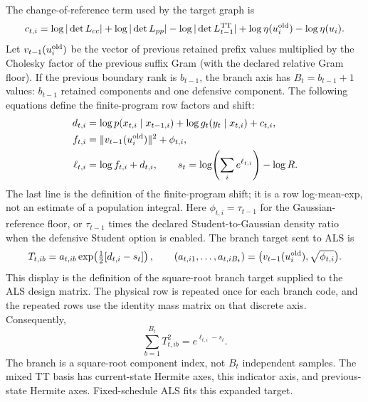 \documentclass[11pt]{article}
\begin{document}
The change-of-reference term used by the target graph is
\begin{equation}
  c_{t,i}=\log|\det L_{cc}|+\log|\det L_{pp}|
  -\log|\det L_{t-1}^{\rm TT}|
  +\log\eta(u_i^{\rm old})-\log\eta(u_i).
  \label{eq:actual-conversion}
\end{equation}
Let $v_{t-1}(u_i^{\rm old})$ be the vector of previous retained prefix
values multiplied by the Cholesky factor of the previous suffix Gram (with
the declared relative Gram floor).  If the previous boundary rank is
$b_{t-1}$, the branch axis has $B_t=b_{t-1}+1$ values: $b_{t-1}$ retained
components and one defensive component.  The following equations define the
finite-program row factors and shift:
\begin{align}
  d_{t,i}&=\log p(x_{t,i}\mid x_{t-1,i})
       +\log g_t(y_t\mid x_{t,i})+c_{t,i},
  \label{eq:actual-transition-factor}\\
  f_{t,i}&=\lVert v_{t-1}(u_i^{\rm old})\rVert^2+\phi_{t,i},
  \label{eq:actual-previous-energy}\\
  \ell_{t,i}&=\log f_{t,i}+d_{t,i},
  \qquad
  s_t=\log\!\left(\sum_i e^{\ell_{t,i}}\right)-\log R.
  \label{eq:actual-transition-scale}
\end{align}
The last line is the definition of the finite-program shift; it is a row
log-mean-exp, not an estimate of a population integral.
Here $\phi_{t,i}=\tau_{t-1}$ for the Gaussian-reference floor, or
$\tau_{t-1}$ times the declared Student-to-Gaussian density ratio when the
defensive Student option is enabled.  The branch target sent to ALS is
\begin{equation}
  T_{t,ib}=a_{t,ib}\exp\!\left(\tfrac12[d_{t,i}-s_t]\right),
  \qquad
  (a_{t,i1},\ldots,a_{t,iB_t})
  =\bigl(v_{t-1}(u_i^{\rm old}),\sqrt{\phi_{t,i}}\bigr).
  \label{eq:actual-transition-branch-target}
\end{equation}
This display is the definition of the square-root branch target supplied to
the ALS design matrix.
The physical row is repeated once for each branch code, and the repeated rows
use the identity mass matrix on that discrete axis.  Consequently,
\begin{equation}
  \sum_{b=1}^{B_t}T_{t,ib}^2=e^{\ell_{t,i}-s_t}.
  \label{eq:actual-transition-branch-closure}
\end{equation}
The branch is a square-root component index, not $B_t$ independent samples.
The mixed TT basis has current-state Hermite axes, this indicator axis, and
previous-state Hermite axes.  Fixed-schedule ALS fits this expanded target.
\end{document}

